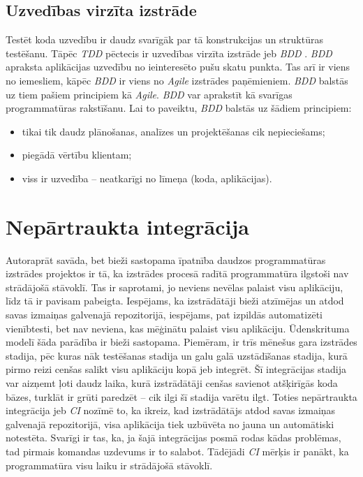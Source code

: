 \subsection{Uzvedības virzīta izstrāde}
Testēt koda uzvedību ir daudz svarīgāk par tā konstrukcijas un struktūras testēšanu. Tāpēc \textit{TDD} pēctecis ir uzvedības virzīta izstrāde jeb \textit{BDD} . \textit{BDD} apraksta aplikācijas uzvedību no ieinteresēto pušu skatu punkta. Tas arī ir viens no iemesliem, kāpēc \textit{BDD} ir viens no \textit{Agile} izstrādes paņēmieniem. \textit{BDD} balstās uz tiem pašiem principiem kā \textit{Agile}.
\textit{BDD} var aprakstīt kā svarīgas programmatūras rakstīšanu. Lai to paveiktu, \textit{BDD} balstās uz šādiem principiem:
\begin{itemize}
	\item tikai tik daudz plānošanas, analīzes un projektēšanas cik nepieciešams;
	\item piegādā vērtību klientam;
	\item viss ir uzvedība -- neatkarīgi no līmeņa (koda, aplikācijas).
\end{itemize}
\cite{chelimsky2010Rspec}


\section{Nepārtraukta integrācija}
Autoraprāt savāda, bet bieži sastopama īpatnība daudzos programmatūras izstrādes projektos ir tā, ka izstrādes procesā radītā programmatūra ilgstoši nav strādājošā stāvoklī. Tas ir saprotami, jo neviens nevēlas palaist visu aplikāciju, līdz tā ir pavisam pabeigta. Iespējams, ka izstrādātāji bieži atzīmējas un atdod savas izmaiņas galvenajā repozitorijā, iespējams, pat izpildās automatizēti vienībtesti, bet nav neviena, kas mēģinātu palaist visu aplikāciju. Ūdenskrituma modelī šāda parādība ir bieži sastopama. Piemēram, ir trīs mēnešus gara izstrādes stadija, pēc kuras nāk testēšanas stadija un galu galā uzstādīšanas stadija, kurā pirmo reizi cenšas salikt visu aplikāciju kopā jeb integrēt. Šī integrācijas stadija var aizņemt ļoti daudz laika, kurā izstrādātāji cenšas savienot atšķirīgās koda bāzes, turklāt ir grūti paredzēt -- cik ilgi šī stadija varētu ilgt.
Toties nepārtraukta integrācija jeb \textit{CI}  nozīmē to, ka ikreiz, kad izstrādātājs atdod savas izmaiņas galvenajā repozitorijā, visa aplikācija tiek uzbūvēta no jauna un automātiski notestēta. Svarīgi ir tas, ka, ja šajā integrācijas posmā rodas kādas problēmas, tad pirmais komandas uzdevums ir to salabot. Tādējādi \textit{CI} mērķis ir panākt, ka programmatūra visu laiku ir strādājošā stāvoklī.

